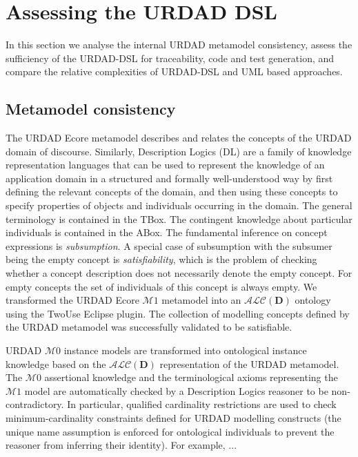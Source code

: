 \section{Assessing the URDAD DSL \label{sec:assessment}}

In this section we analyse the internal URDAD metamodel consistency, assess the sufficiency of the URDAD-DSL for traceability, code and test generation, and compare the relative complexities of URDAD-DSL and UML based approaches.


\subsection{Metamodel consistency}

The URDAD Ecore metamodel describes and relates the concepts of the URDAD domain of discourse. Similarly, Description Logics (DL) are a family of knowledge representation languages that can be used to represent the knowledge of an application domain in a structured and formally well-understood way by first defining the relevant concepts of the domain, and then using these concepts to specify properties of objects and individuals occurring in the domain. The general terminology is contained in the TBox. The contingent knowledge about particular individuals is contained in the ABox. The fundamental inference on concept expressions is \emph{subsumption}. A special case of subsumption with the subsumer being the empty concept is \emph{satisfiability}, which is the problem of checking whether a concept description does not necessarily denote the empty concept. For empty concepts the set of individuals of this concept is always empty. We transformed the URDAD Ecore $\mathcal{M}1$ metamodel into an $\mathcal{ALC}(\textbf{D})$ ontology using the TwoUse \cite{parreiras_using_2010} Eclipse plugin. The collection of modelling concepts defined by the URDAD metamodel was successfully validated to be satisfiable.

URDAD $\mathcal{M}0$ instance models are transformed into ontological instance knowledge based on the $\mathcal{ALC}(\textbf{D})$ representation of the URDAD metamodel. The $\mathcal{M}0$ assertional knowledge and the terminological axioms representing the $\mathcal{M}1$ model are automatically checked by a Description Logics reasoner to be non-contradictory. In particular, qualified cardinality restrictions are used to check minimum-cardinality constraints defined for URDAD modelling constructs (the unique name assumption is enforced for ontological individuals to prevent the reasoner from inferring their identity). For example, ...

